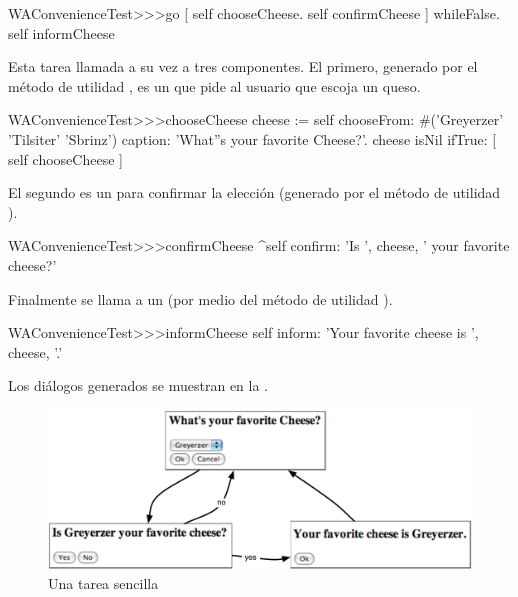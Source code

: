 \documentclass[a4paper,10pt,twoside]{book}
\begin{document}
\begin{code}{}
WAConvenienceTest>>>go
	[ self chooseCheese.
	  self confirmCheese ] whileFalse.
	self informCheese
\end{code}

Esta tarea llamada a su vez a tres componentes.
El primero, generado por el método de utilidad , es un  que pide al usuario que escoja un queso.

\begin{code}{}
WAConvenienceTest>>>chooseCheese
	cheese := self
		chooseFrom: #('Greyerzer' 'Tilsiter' 'Sbrinz')
		caption: 'What''s your favorite Cheese?'.
	cheese isNil ifTrue: [ self chooseCheese ]
\end{code}


El segundo es un  para confirmar la elección (generado por el método de utilidad ).

\begin{code}{}
WAConvenienceTest>>>confirmCheese
	^self confirm: 'Is ', cheese,  ' your favorite cheese?'
\end{code}

Finalmente se llama a un  (por medio del método de utilidad ).

\begin{code}{}
WAConvenienceTest>>>informCheese
	self inform: 'Your favorite cheese is ', cheese, '.'
\end{code}

Los diálogos generados se muestran en la .

\begin{figure}[ht]
\begin{center}
\includegraphics[width=\textwidth]{chooseCheese}
\caption{Una tarea sencilla}
\end{center}
\end{figure}
\end{document}

